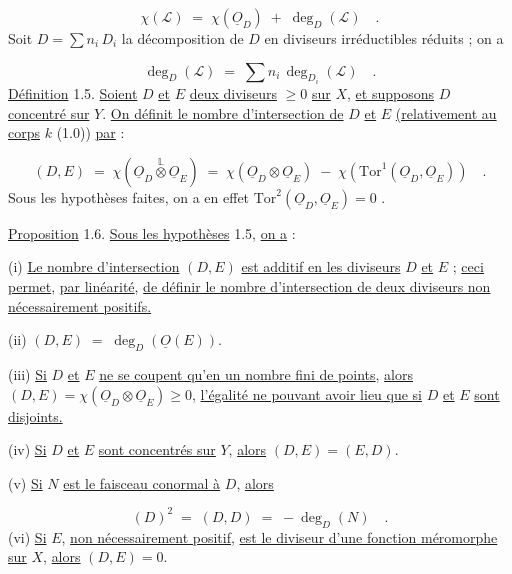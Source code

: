 \begin{equation}\tag{1.4.6}
\chi(\mathcal{L}) \;=\; \chi(\underline{O}_D) \;+\; \deg_D(\mathcal{L}) \quad .
\end{equation}
Soit $D = \sum n_i \, D_i$ la décomposition de $D$ en diviseurs irréductibles réduits ; on a

\begin{equation}\tag{1.4.7}
\deg_D(\mathcal{L}) \;=\; \sum n_i \, \deg_{D_i}(\mathcal{L}) \quad .
\end{equation}
\underline{Définition} 1.5. \underline{Soient} $D$ \underline{et} $E$ \underline{deux diviseurs} $\geq 0$ \underline{sur} $X$, \underline{et supposons} $D$ \underline{concentré sur} $Y$. \underline{On définit le nombre d'intersection de} $D$ \underline{et} $E$ \underline{(relativement au corps} $k$ (1.0)) \underline{par} :

\begin{equation*}
(D,E) \;=\; \chi(\underline{O}_D \overset{\mathbb{L}}{\otimes} \underline{O}_E) \;=\; \chi(\underline{O}_D \otimes \underline{O}_E) \;-\; \chi(\mathrm{Tor}^{1}(\underline{O}_D,\underline{O}_E)) \quad .
\end{equation*}
Sous les hypothèses faites, on a en effet $\mathrm{Tor}^{2}(\underline{O}_D,\underline{O}_E) = 0$ .

\underline{Proposition} 1.6. \underline{Sous les hypothèses} 1.5, \underline{on a} :

(i) \quad \underline{Le nombre d'intersection} $(D,E)$ \underline{est additif en les diviseurs} $D$ \underline{et} $E$ ; \underline{ceci permet}, \underline{par linéarité}, \underline{de définir le nombre d'intersection de deux diviseurs non nécessairement positifs.}



(ii) \quad $(D,E) \;=\; \deg_D(\underline{O}(E))$.

(iii) \quad \underline{Si} $D$ \underline{et} $E$ \underline{ne se coupent qu'en un nombre fini de points}, \underline{alors} $(D,E) = \chi(\underline{O}_D \otimes \underline{O}_E) \geq 0$, \underline{l'égalité ne pouvant avoir lieu que si} $D$ \underline{et} $E$ \underline{sont disjoints.}

(iv) \quad \underline{Si} $D$ \underline{et} $E$ \underline{sont concentrés sur} $Y$, \underline{alors} $(D,E) = (E,D)$.

(v) \quad \underline{Si} $N$ \underline{est le faisceau conormal à} $D$, \underline{alors}

\begin{equation*}
(D)^{2} \;=\; (D,D) \;=\; - \deg_D(N) \quad .
\end{equation*}
(vi) \quad \underline{Si} $E$, \underline{non nécessairement positif}, \underline{est le diviseur d'une fonction méromorphe sur} $X$, \underline{alors} $(D,E) = 0$.


